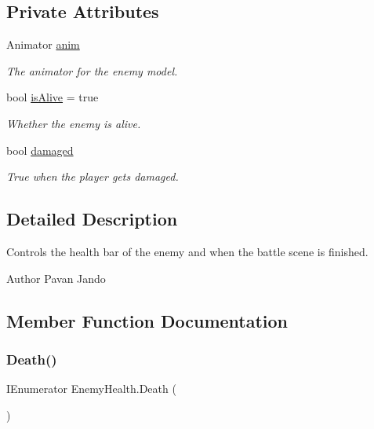 \subsection*{Private Attributes}
\begin{DoxyCompactItemize}
\item 
Animator \mbox{\hyperlink{class_enemy_health_a87ac641128bbd5abf5db6cc3f7bf9a87}{anim}}
\begin{DoxyCompactList}\small\item\em The animator for the enemy model. \end{DoxyCompactList}\item 
bool \mbox{\hyperlink{class_enemy_health_a45d17a7737377529a53d884743688afc}{is\+Alive}} = true
\begin{DoxyCompactList}\small\item\em Whether the enemy is alive. \end{DoxyCompactList}\item 
bool \mbox{\hyperlink{class_enemy_health_ad1b5807be63eec745d95623ce660c0c8}{damaged}}
\begin{DoxyCompactList}\small\item\em True when the player gets damaged. \end{DoxyCompactList}\end{DoxyCompactItemize}


\subsection{Detailed Description}
Controls the health bar of the enemy and when the battle scene is finished. 

\begin{DoxyAuthor}{Author}
Pavan Jando
\end{DoxyAuthor}


\subsection{Member Function Documentation}
\mbox{\label{class_enemy_health_a4f03b1ab160d8488f3e599384e5dcdbd}} 
\subsubsection{\texorpdfstring{Death()}{Death()}}
{\footnotesize\ttfamily I\+Enumerator Enemy\+Health.\+Death (\begin{DoxyParamCaption}{ }\end{DoxyParamCaption})\hspace{0.3cm}{\ttfamily [private]}}



